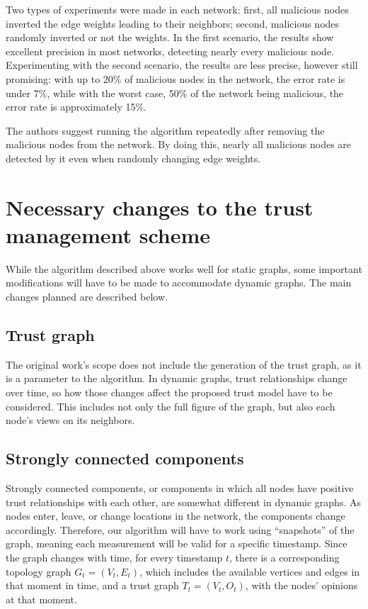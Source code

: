 Two types of experiments were made in each network: first, all malicious nodes inverted the edge weights leading to their neighbors; second, malicious nodes randomly inverted or not the weights.
In the first scenario, the results show excellent precision in most networks, detecting nearly every malicious node.
Experimenting with the second scenario, the results are less precise, however still promising: with up to 20\% of malicious nodes in the network, the error rate is under 7\%, while with the worst case, 50\% of the network being malicious, the error rate is approximately 15\%.

The authors suggest running the algorithm repeatedly after removing the malicious nodes from the network.
By doing this, nearly all malicious nodes are detected by it even when randomly changing edge weights. 


%
%
%
%


\section{Necessary changes to the trust management scheme}
\label{section:changes}
While the algorithm described above works well for static graphs, some important modifications will have to be made to accommodate dynamic graphs.
The main changes planned are described below.
\subsection{Trust graph}
The original work's scope does not include the generation of the trust graph, as it is a parameter to the algorithm.
In dynamic graphs, trust relationships change over time, so how those changes affect the proposed trust model have to be considered.
This includes not only the full figure of the graph, but also each node's views on its neighbors.

\subsection{Strongly connected components}
Strongly connected components, or components in which all nodes have positive trust relationships with each other, are somewhat different in dynamic graphs.
As nodes enter, leave, or change locations in the network, the components change accordingly.
Therefore, our algorithm will have to work using ``snapshots'' of the graph, meaning each measurement will be valid for a specific timestamp.
Since the graph changes with time, for every timestamp $t$, there is a corresponding topology graph $G_t=(V_t, E_t)$, which includes the available vertices and edges in that moment in time, and a trust graph $T_t=(V_t, O_t)$, with the nodes' opinions at that moment.

